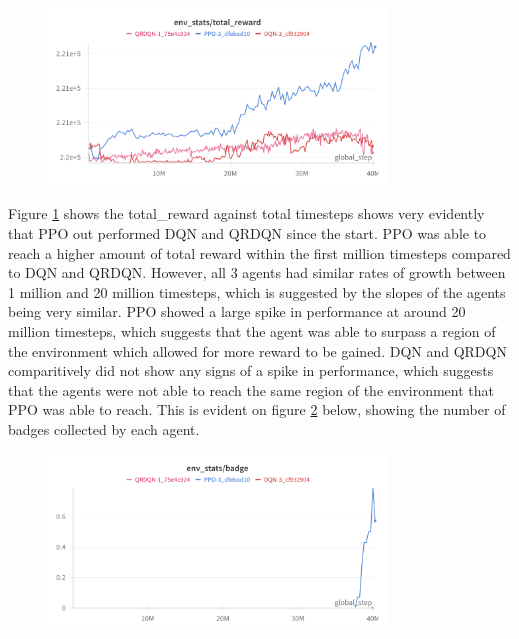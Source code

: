 \begin{figure}[H]
    \centering
    \includegraphics[width=0.8\textwidth]{figures/all_step_total_reward.png}
    \caption{}
    \label{fig:agent_eval_all_reward}
\end{figure}

Figure \ref{fig:agent_eval_all_reward} shows the total\_reward against total timesteps shows very evidently that PPO out performed DQN and QRDQN since the start. PPO was able to reach a higher amount of total reward within the first million timesteps compared to DQN and QRDQN. However, all 3 agents had similar rates of growth between 1 million and 20 million timesteps, which is suggested by the slopes of the agents being very similar. PPO showed a large spike in performance at around 20 million timesteps, which suggests that the agent was able to surpass a region of the environment which allowed for more reward to be gained. DQN and QRDQN comparitively did not show any signs of a spike in performance, which suggests that the agents were not able to reach the same region of the environment that PPO was able to reach. This is evident on figure \ref{fig:agent_eval_all_badge} below, showing the number of badges collected by each agent.

\begin{figure}[H]
    \centering
    \includegraphics[width=0.8\textwidth]{figures/all_step_badge.png}
    \caption{}
    \label{fig:agent_eval_all_badge}
\end{figure}

